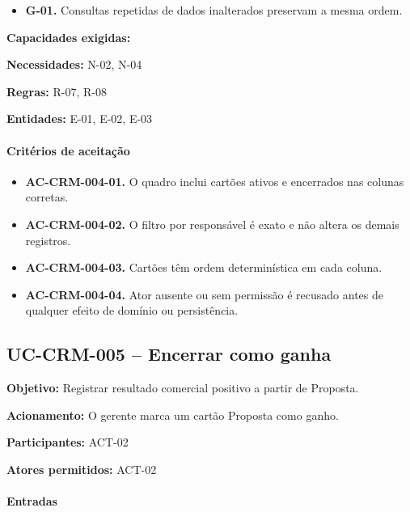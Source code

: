 \documentclass[10pt,a4paper]{article}
\begin{document}
\begin{itemize}

\item \textbf{G-01.} Consultas repetidas de dados inalterados preservam a mesma ordem.

\end{itemize}

\textbf{Capacidades exigidas:} 

\textbf{Necessidades:} N-02, N-04

\textbf{Regras:} R-07, R-08

\textbf{Entidades:} E-01, E-02, E-03

\paragraph{Critérios de aceitação}

\begin{itemize}

\item \textbf{AC-CRM-004-01.} O quadro inclui cartões ativos e encerrados nas colunas corretas.

\item \textbf{AC-CRM-004-02.} O filtro por responsável é exato e não altera os demais registros.

\item \textbf{AC-CRM-004-03.} Cartões têm ordem determinística em cada coluna.

\item \textbf{AC-CRM-004-04.} Ator ausente ou sem permissão é recusado antes de qualquer efeito de domínio ou persistência.

\end{itemize}

\subsection{UC-CRM-005 -- Encerrar como ganha}

\textbf{Objetivo:} Registrar resultado comercial positivo a partir de Proposta.

\textbf{Acionamento:} O gerente marca um cartão Proposta como ganho.

\textbf{Participantes:} ACT-02

\textbf{Atores permitidos:} ACT-02

\paragraph{Entradas}
\end{document}
